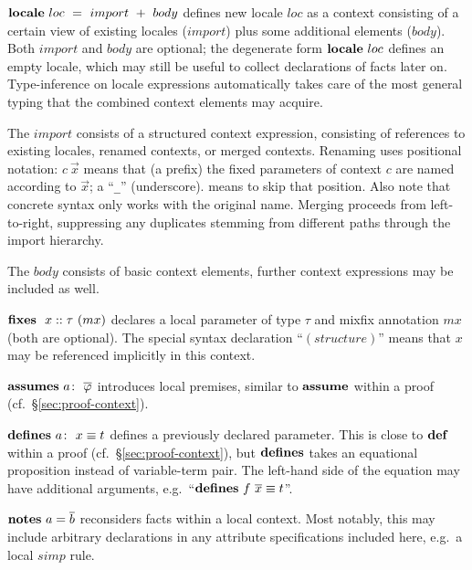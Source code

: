 \begin{descr}

\item [${\mathord{\mathbf{locale}}}~loc~=~import~+~body$] defines new locale $loc$ as a context
  consisting of a certain view of existing locales ($import$) plus some
  additional elements ($body$).  Both $import$ and $body$ are optional; the
  degenerate form ${\mathord{\mathbf{locale}}}~loc$ defines an empty locale, which may still be
  useful to collect declarations of facts later on.  Type-inference on locale
  expressions automatically takes care of the most general typing that the
  combined context elements may acquire.

  The $import$ consists of a structured context expression, consisting of
  references to existing locales, renamed contexts, or merged contexts.
  Renaming uses positional notation: $c~\vec x$ means that (a prefix) the
  fixed parameters of context $c$ are named according to $\vec x$; a
  ``\texttt{_}'' (underscore). means to skip that
  position.  Also note that concrete syntax only works with the original name.
  Merging proceeds from left-to-right, suppressing any duplicates stemming
  from different paths through the import hierarchy.

  The $body$ consists of basic context elements, further context expressions
  may be included as well.

  \begin{descr}

  \item [${\mathord{\mathbf{fixes}}}~~x::\tau~(mx)$] declares a local parameter of type $\tau$
    and mixfix annotation $mx$ (both are optional).  The special syntax
    declaration ``$(structure)$'' means that $x$ may be referenced
    implicitly in this context.

  \item [$\ASSUMES{a}{\vec\phi}$] introduces local premises, similar to
    ${\mathord{\mathbf{assume}}}$ within a proof (cf.\ \S\ref{sec:proof-context}).

  \item [$\DEFINES{a}{x \equiv t}$] defines a previously declared parameter.
    This is close to ${\mathord{\mathbf{def}}}$ within a proof (cf.\
    \S\ref{sec:proof-context}), but ${\mathord{\mathbf{defines}}}$ takes an equational
    proposition instead of variable-term pair.  The left-hand side of the
    equation may have additional arguments, e.g.\ ``$\DEFINES{}{f~\vec x
      \equiv t}$''.

  \item [$\NOTES{a}{\vec b}$] reconsiders facts within a local context.  Most
    notably, this may include arbitrary declarations in any attribute
    specifications included here, e.g.\ a local $simp$ rule.


\end{descr}
\end{descr}
